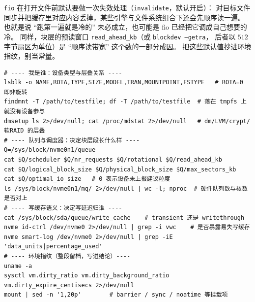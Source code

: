 \documentclass[12pt,a4paper,fontset=fandol]{ctexbook}
\newcommand{\Tp}[1]{\texttt{#1}}
\newcommand{\Opt}[1]{\texttt{-\/-#1}}
\begin{document}
\begin{note}[title={fio 会自己动缓存：\Opt{invalidate}、预读与 \Tp{fadvise}}]
\Tp{fio} 在打开文件前默认要做一次失效处理（\Tp{invalidate}，默认开启）：
对目标文件同步并把缓存里对应内容丢掉，某些引擎与文件系统组合下还会先顺序读一遍。
也就是说 ``跑第一遍就是冷的'' 未必成立，也可能是 fio 已经把它调成自己想要的冷。
同样，块层的预读窗口 \Tp{read\_ahead\_kb}（或 \Tp{blockdev --getra}，
后者以 $512$ 字节扇区为单位）是 ``顺序读带宽'' 这个数的一部分成因。
把这些默认值抄进环境指纹，别当常量。
\end{note}

\begin{lstlisting}[style=shellstyle,caption={测之前先确认设备与调度器：可跑的检查清单（全部本机自证，不抄别人的表）},label={lst:pm08-probe-cmd}]
# ---- 我是谁：设备类型与层叠关系 ----
lsblk -o NAME,ROTA,TYPE,SIZE,MODEL,TRAN,MOUNTPOINT,FSTYPE   # ROTA=0 即非旋转
findmnt -T /path/to/testfile; df -T /path/to/testfile  # 落在 tmpfs 上就没有设备参与
dmsetup ls 2>/dev/null; cat /proc/mdstat 2>/dev/null   # dm/LVM/crypt/软RAID 的层叠
# ---- 队列与调度器：决定块层段长什么样 ----
Q=/sys/block/nvme0n1/queue
cat $Q/scheduler $Q/nr_requests $Q/rotational $Q/read_ahead_kb
cat $Q/logical_block_size $Q/physical_block_size $Q/max_sectors_kb
cat $Q/optimal_io_size   # 0 表示设备未上报建议粒度
ls /sys/block/nvme0n1/mq/ 2>/dev/null | wc -l; nproc  # 硬件队列数与核数是否对上
# ---- 写缓存语义：决定写延迟归谁 ----
cat /sys/block/sda/queue/write_cache    # transient 还是 writethrough
nvme id-ctrl /dev/nvme0 2>/dev/null | grep -i vwc    # 是否暴露易失写缓存
nvme smart-log /dev/nvme0 2>/dev/null | grep -iE 'data_units|percentage_used'
# ---- 环境指纹（整段留档，写进结论）----
uname -a
sysctl vm.dirty_ratio vm.dirty_background_ratio vm.dirty_expire_centisecs 2>/dev/null
mount | sed -n '1,20p'        # barrier / sync / noatime 等挂载项
\end{lstlisting}
\end{document}
